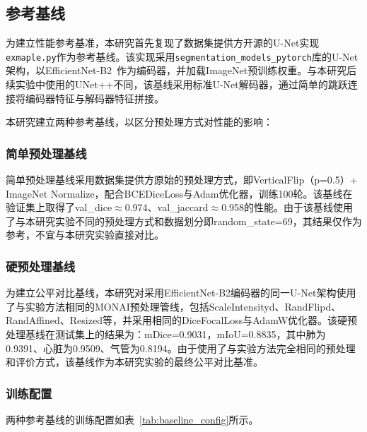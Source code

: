 \documentclass[12pt, a4paper]{article}
\begin{document}
\subsection{参考基线}
\label{sec:baseline}

为建立性能参考基准，本研究首先复现了数据集提供方开源的U-Net实现\texttt{exmaple.py}作为参考基线。该实现采用\texttt{segmentation\_models\_pytorch}库的U-Net架构，以EfficientNet-B2~\cite{tan2019efficientnet}作为编码器，并加载ImageNet预训练权重。与本研究后续实验中使用的UNet++不同，该基线采用标准U-Net解码器，通过简单的跳跃连接将编码器特征与解码器特征拼接。

本研究建立两种参考基线，以区分预处理方式对性能的影响：

\subsubsection{简单预处理基线}

简单预处理基线采用数据集提供方原始的预处理方式，即VerticalFlip（p=0.5）+ ImageNet Normalize，配合BCEDiceLoss与Adam优化器，训练100轮。该基线在验证集上取得了val\_dice$\approx$0.974、val\_jaccard$\approx$0.958的性能。由于该基线使用了与本研究实验不同的预处理方式和数据划分即random\_state=69，其结果仅作为参考，不宜与本研究实验直接对比。

\subsubsection{硬预处理基线}

为建立公平对比基线，本研究对采用EfficientNet-B2编码器的同一U-Net架构使用了与实验方法相同的MONAI预处理管线，包括ScaleIntensityd、RandFlipd、RandAffined、Resized等，并采用相同的DiceFocalLoss与AdamW优化器。该硬预处理基线在测试集上的结果为：mDice=0.9031，mIoU=0.8835，其中肺为0.9391、心脏为0.9509、气管为0.8194。由于使用了与实验方法完全相同的预处理和评价方式，该基线作为本研究实验的最终公平对比基准。

\subsubsection{训练配置}

两种参考基线的训练配置如表~\ref{tab:baseline_config}所示。
\end{document}
